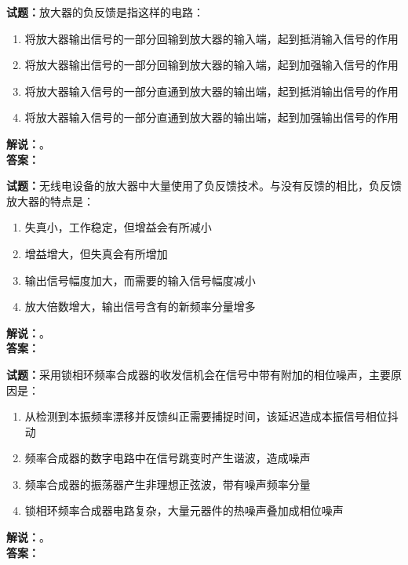 \documentclass{ctexbook}
\begin{document}
\bigskip




\noindent\textbf{试题：}放大器的负反馈是指这样的电路：
\begin{enumerate}[leftmargin=3em]
\item 将放大器输出信号的一部分回输到放大器的输入端，起到抵消输入信号的作用
\item 将放大器输出信号的一部分回输到放大器的输入端，起到加强输入信号的作用
\item 将放大器输入信号的一部分直通到放大器的输出端，起到抵消输出信号的作用
\item 将放大器输入信号的一部分直通到放大器的输出端，起到加强输出信号的作用
\end{enumerate}
\noindent\textbf{解说：}\textbf{}。\\\noindent\textbf{答案：}

\bigskip




\noindent\textbf{试题：}无线电设备的放大器中大量使用了负反馈技术。与没有反馈的相比，负反馈放大器的特点是：
\begin{enumerate}[leftmargin=3em]
\item 失真小，工作稳定，但增益会有所减小
\item 增益增大，但失真会有所增加
\item 输出信号幅度加大，而需要的输入信号幅度减小
\item 放大倍数增大，输出信号含有的新频率分量增多
\end{enumerate}
\noindent\textbf{解说：}\textbf{}。\\\noindent\textbf{答案：}

\bigskip




\noindent\textbf{试题：}采用锁相环频率合成器的收发信机会在信号中带有附加的相位噪声，主要原因是：
\begin{enumerate}[leftmargin=3em]
\item 从检测到本振频率漂移并反馈纠正需要捕捉时间，该延迟造成本振信号相位抖动
\item 频率合成器的数字电路中在信号跳变时产生谐波，造成噪声
\item 频率合成器的振荡器产生非理想正弦波，带有噪声频率分量
\item 锁相环频率合成器电路复杂，大量元器件的热噪声叠加成相位噪声
\end{enumerate}
\noindent\textbf{解说：}\textbf{}。\\\noindent\textbf{答案：}

\bigskip
\end{document}
